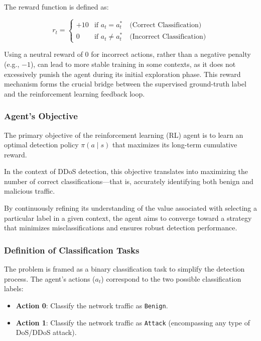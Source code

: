 \documentclass{report}
\begin{document}
The reward function is defined as:

\[
r_t =
\begin{cases}
+10 & \text{if } a_t = a_t^* \quad \text{(Correct Classification)} \\
0   & \text{if } a_t \ne a_t^* \quad \text{(Incorrect Classification)}
\end{cases}
\]

Using a neutral reward of 0 for incorrect actions, rather than a negative penalty (e.g., $-1$), can lead to more stable training in some contexts, as it does not excessively punish the agent during its initial exploration phase. This reward mechanism forms the crucial bridge between the supervised ground-truth label and the reinforcement learning feedback loop.

\subsubsection{Agent's Objective}

The primary objective of the reinforcement learning (RL) agent is to learn an optimal detection policy $\pi(a \mid s)$ that maximizes its long-term cumulative reward. 

In the context of DDoS detection, this objective translates into maximizing the number of correct classifications—that is, accurately identifying both benign and malicious traffic. 

By continuously refining its understanding of the value associated with selecting a particular label in a given context, the agent aims to converge toward a strategy that minimizes misclassifications and ensures robust detection performance.

\subsubsection{Definition of Classification Tasks}

The problem is framed as a binary classification task to simplify the detection process. The agent's actions ($a_t$) correspond to the two possible classification labels:

\begin{itemize}
  \item \textbf{Action 0}: Classify the network traffic as \texttt{Benign}.
  \item \textbf{Action 1}: Classify the network traffic as \texttt{Attack} (encompassing any type of DoS/DDoS attack).
\end{itemize}
\end{document}

